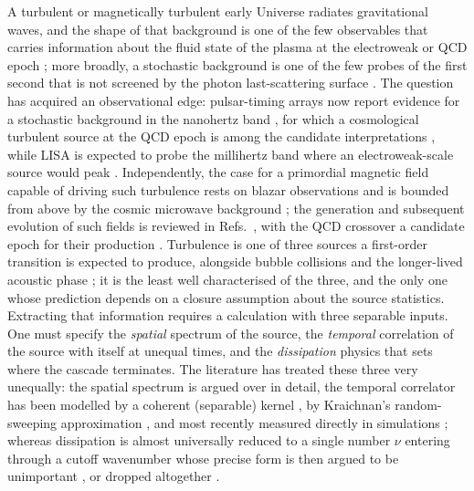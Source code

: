 \documentclass[10pt,prd,aps,nobibnotes,superscriptaddress,preprintnumbers,notitlepage]{revtex4-1}
\begin{document}
A turbulent or magnetically turbulent early Universe radiates gravitational waves,
and the shape of that background is one of the few observables that carries
information about the fluid state of the plasma at the electroweak or QCD epoch
\cite{Kosowsky:2001xp,Gogoberidze:2007an,Kahniashvili:2008pe,Caprini:2018mtu};
more broadly, a stochastic background is one of the few probes of the first second
that is not screened by the photon last-scattering surface
\cite{Maggiore:1999vm,Dent:2024bhi,Roshan:2024qnv}. The question
has acquired an observational edge: pulsar-timing arrays now report evidence for a
stochastic background in the nanohertz band \cite{NANOGrav:2023gor}, for which a
cosmological turbulent source at the QCD epoch is among the candidate
interpretations \cite{RoperPol:2022iel}, while LISA is expected to probe the
millihertz band where an electroweak-scale source would peak
\cite{Caprini:2019egz}. Independently, the case for a primordial magnetic field
capable of driving such turbulence rests on blazar observations
\cite{Neronov:2010gir} and is bounded from above by the cosmic microwave background
\cite{Paoletti:2022gsn}; the generation and subsequent evolution of such fields is
reviewed in Refs.~\cite{Enqvist:1998fw,Durrer:2013pga,Subramanian:2015lua}, with
the QCD crossover a candidate epoch for their production
\cite{Miniati:2017kah}.
Turbulence is one of three
sources a first-order transition is expected to produce, alongside bubble
collisions and the longer-lived acoustic phase \cite{Hindmarsh:2013xza}; it is
the least well characterised of the three, and the only one whose prediction
depends on a closure assumption about the source statistics. Extracting
that information requires a calculation with three separable inputs. One must
specify the \emph{spatial} spectrum of the source, the \emph{temporal} correlation
of the source with itself at unequal times, and the \emph{dissipation} physics
that sets where the cascade terminates. The literature has treated these three
very unequally: the spatial spectrum is argued over in detail, the temporal
correlator has been modelled by a coherent (separable) kernel
\cite{Caprini:2006jb,Caprini:2009yp}, by Kraichnan's random-sweeping
approximation \cite{Kraichnan:1964,Tennekes:1975,He:2017,Gogoberidze:2007an},
and most recently measured directly in simulations \cite{Auclair:2022jod}; whereas
dissipation is almost universally reduced to a single number $\nu$ entering
through a cutoff wavenumber whose precise form is then argued to be unimportant
\cite{Niksa:2018ofa}, or dropped altogether \cite{Auclair:2022jod}.
\end{document}
